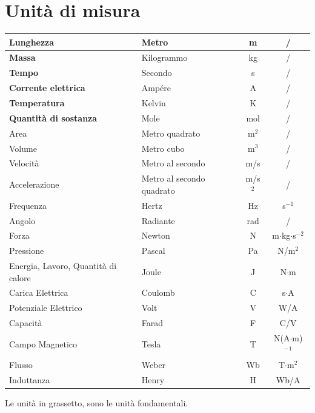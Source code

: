 \documentclass[8pt, a4paper, twocolumn, usenames, dvipsnames]{extarticle}
\begin{document}
\section{Unità di misura}
\tablelasttail{\bottomrule}
\begin{center}
  \begin{xtabular}{ M{1.8cm}  M{1.8cm}  c  c }
    \textbf{Lunghezza} & Metro & m & / \\ \midrule
    \textbf{Massa} & Kilogrammo & kg & / \\ \midrule
    \textbf{Tempo} & Secondo & s & / \\ \midrule
    \textbf{Corrente elettrica} & Ampére & A & / \\ \midrule
    \textbf{Temperatura} & Kelvin & K & / \\ \midrule
    \textbf{Quantità di sostanza} & Mole & mol & / \\ \midrule
    Area & Metro quadrato & m$^2$ & / \\ \midrule
    Volume & Metro cubo & m$^3$ & / \\ \midrule
    Velocità & Metro al secondo & m/s & / \\ \midrule
    Accelerazione & Metro al secondo quadrato & m/s$^2$ & / \\ \midrule
    Frequenza & Hertz & Hz & s$^{-1}$ \\ \midrule
    Angolo & Radiante & rad & / \\ \midrule
    Forza & Newton & N & m$\cdot$kg$\cdot$s$^{-2}$ \\ \midrule
    Pressione & Pascal & Pa & N/m$^2$ \\ \midrule
    Energia, Lavoro, Quantità di calore & Joule & J & N$\cdot$m \\ \midrule
    Carica Elettrica & Coulomb & C & s$\cdot$A \\ \midrule
    Potenziale Elettrico & Volt & V & W/A \\ \midrule
    Capacità & Farad & F & C/V \\ \midrule
    Campo Magnetico & Tesla & T & N(A$\cdot$m)$^{-1}$ \\ \midrule
    Flusso & Weber & Wb & T$\cdot$m$^2$\\ \midrule
    Induttanza & Henry & H &Wb/A\\ \midrule
  \end{xtabular}
\end{center}
Le unità in grassetto, sono le unità fondamentali.

%













\newpage
\listoftodos[Note]
\end{document}
